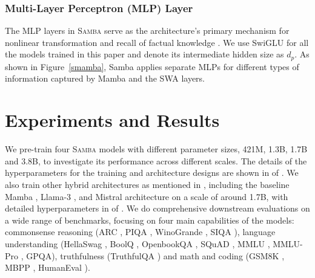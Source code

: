 \documentclass{article}
\begin{document}
\subsubsection{Multi-Layer Perceptron (MLP) Layer}
The MLP layers in \textsc{Samba} serve as the architecture's primary mechanism for nonlinear transformation and recall of factual knowledge \citep{dai2021knowledge}. We use SwiGLU \citep{shazeer2020glu} for all the models trained in this paper and denote its intermediate hidden size as $d_p$. As shown in Figure~\ref{smamba}, Samba applies separate MLPs for different types of information captured by Mamba and the SWA layers. 




\section{Experiments and Results}
\label{headings_exp}

We pre-train four \textsc{Samba} models with different parameter sizes, 421M, 1.3B, 1.7B and 3.8B, to investigate its performance across different scales. The details of the hyperparameters for the training and architecture designs are shown in  of .  We also train other hybrid architectures as mentioned in , including the baseline Mamba \citep{gu2023mamba}, Llama-3 \citep{llama3,dubey2024llama}, and Mistral \citep{jiang2023mistral} architecture on a scale of around 1.7B, with detailed hyperparameters in  of . We do comprehensive downstream evaluations on a wide range of benchmarks, focusing on four main capabilities of the models: commonsense reasoning (ARC \citep{arc}, PIQA \citep{piqa}, WinoGrande \citep{winogrande}, SIQA \citep{siqa}), language understanding (HellaSwag \citep{zellers2019hellaswag}, BoolQ \citep{boolq}, OpenbookQA \citep{openbookqa}, SQuAD \citep{rajpurkar2016squad}, MMLU \citep{mmlu}, MMLU-Pro \citep{wang2024mmlupro}, GPQA\citep{rein2023gpqa}), truthfulness (TruthfulQA \citep{lin-etal-2022-truthfulqa}) and math and coding (GSM8K \citep{gsm8k}, MBPP \citep{mbpp}, HumanEval \citep{humaneval}).
\end{document}
